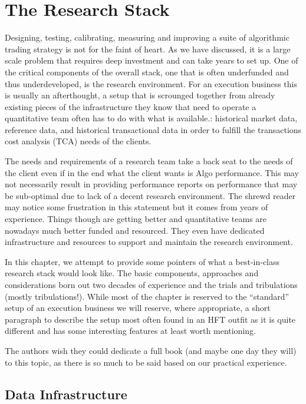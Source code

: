 \chapter{The Research Stack\label{chap:ch_tech_res}}

Designing, testing, calibrating, measuring and improving a suite of algorithmic trading strategy is not for the faint of heart. As we have discussed, it is a large scale problem that requires deep investment and can take years to set up. One of the critical components of the overall stack, one that is often underfunded and thus underdeveloped, is the research environment. For an execution business this is usually an afterthought, a setup that is scrounged together from already existing pieces of the infrastructure they know that need to operate a quantitative team often has to do with what is available.: historical market data, reference data, and historical transactional data in order to fulfill the transactions cost analysis (TCA) needs of the clients.


The needs and requirements of a research team take a back seat to the needs of the client even if in the end what the client wants is Algo performance. This may not necessarily result in providing performance reports on  performance that may be sub-optimal due to lack of a decent research environment. The shrewd reader may notice some frustration in this statement but it comes from years of experience. Things though are getting better and quantitative teams are nowadays much better funded and resourced. They even have dedicated infrastructure and resources to support and maintain the research environment.


In this chapter, we attempt to provide some pointers of what a best-in-class research stack would look like. The basic components, approaches and considerations born out two decades of experience and the trials and tribulations (mostly tribulations!). While most of the chapter is reserved to the ``standard'' setup of an execution business we will reserve, where appropriate, a short paragraph to describe the setup most often found in an HFT outfit as it is quite different and has some interesting features at least worth mentioning.


The authors wish they could dedicate a full book (and maybe one day they will) to this topic, as there is so much to be said based on our practical experience. 



\section{Data Infrastructure\label{sec:tech_data_infra}}\label{in:dat_infr1}

